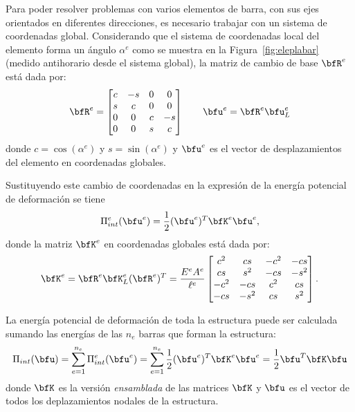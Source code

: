 Para poder resolver problemas con varios elementos de barra, con sus ejes orientados en diferentes direcciones, es necesario trabajar con un sistema de coordenadas global. %
%
Considerando que el sistema de coordenadas local del elemento forma un ángulo $\alpha^e$ como se muestra en la Figura~\ref{fig:eleplabar} (medido antihorario desde el sistema global), la matriz de cambio de base $\bfR^e$ está dada por:
%
\begin{equation}\label{eqn:rotabarra}
\bfR^e = 
\left[
\begin{matrix}
c & -s & 0 & 0 \\
s & c & 0 & 0\\
0 & 0 &  c & -s\\
0 & 0 & s & c
\end{matrix}
\right]
\qquad
\bfu^e = \bfR^e \bfu^e_L
\end{equation}
%
donde $c=\cos(\alpha^e)$ y $s=\sin(\alpha^e)$ y $\bfu^e$ es el vector de desplazamientos del elemento en coordenadas globales. %
%


Sustituyendo este cambio de coordenadas en la expresión de la energía potencial de deformación se tiene
\begin{equation}
\Pi_{int}^e(\bfu^e) = \frac{1}{2} (\bfu^e)^T \bfK^e \bfu^e,
\end{equation}
%
donde la matriz $\bfK^e$ en coordenadas globales está dada por:
%
\begin{equation}
\bfK^e = \bfR^e \bfK^e_L (\bfR^e)^T
= 
\frac{E^e A^e}{\ell^e}
\left[
\begin{matrix}
c^2 & cs & -c^2 & -cs \\
cs & s^2 & -cs & -s^2\\
-c^2 & -cs &  c^2 & cs\\
-cs & -s^2 & cs & s^2
\end{matrix}
\right].
\end{equation}




La energía potencial de deformación de toda la estructura puede ser calculada sumando las energías de las $n_e$ barras que forman la estructura:
%
\begin{equation}\label{eqn:matU}
  \Pi_{int}(\bfu) = \sum_{e=1}^{n_e} \Pi_{int}^e(\bfu^e) = 
   \sum_{e=1}^{n_e} \frac{1}{2} (\bfu^e)^T \bfK^e \bfu^e 
= \frac{1}{2} \bfu^T \bfK \bfu
\end{equation}
%
donde $\bfK$ es la versión \textit{ensamblada} de las matrices $\bfK$ y $\bfu$ es el vector de todos los deplazamientos nodales de la estructura.




